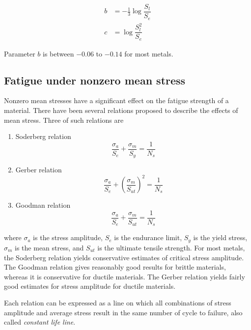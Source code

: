 \documentclass[
10pt,
a4paper,
openany,
svgnames,
]{book} %
\begin{document}
\begin{align*}
  b &= - \frac{1}{3} \log \dfrac{S_l}{S_e} \\
  c &= \log \dfrac{S_l^2}{S_e}
\end{align*}

Parameter $b$ is between $-0.06$ to $-0.14$ for most metals.

\subsection{Fatigue under nonzero mean stress}

Nonzero mean stresses have a significant effect on the fatigue strength of a material. There have been several relations proposed to describe the effects of mean stress. Three of such relations are

\begin{enumerate}
\item Soderberg relation
  \begin{equation}
    \frac{\sigma_a}{S_e} + \frac{\sigma _m}{S_y} = \frac{1}{N_s}
  \end{equation}
\item Gerber relation
  \begin{equation}
    \frac{\sigma_a}{S_e} + \left( \frac{\sigma_m}{S_{ut}} \right)^2 = \frac{1}{N_s}
  \end{equation}
\item Goodman relation
  \begin{equation}
    \frac{\sigma_a}{S_e} + \frac{\sigma _m}{S_{ut}} = \frac{1}{N_s}
  \end{equation}
\end{enumerate}

where $\sigma_a$ is the stress amplitude, $S_e$ is the endurance limit, $S_y$ is the yield stress, $\sigma_m$ is the mean stress, and $S_{ut}$ is the ultimate tensile strength. For most metals, the Soderberg relation yields conservative estimates of critical stress amplitude. The Goodman relation gives reasonably good results for brittle materials, whereas it is conservative for ductile materials. The Gerber relation yields fairly good estimates for stress amplitude for ductile materials.

Each relation can be expressed as a line on which all combinations of stress amplitude and average stress result in the same number of cycle to failure, also called \emph{constant life line}.
\end{document}
